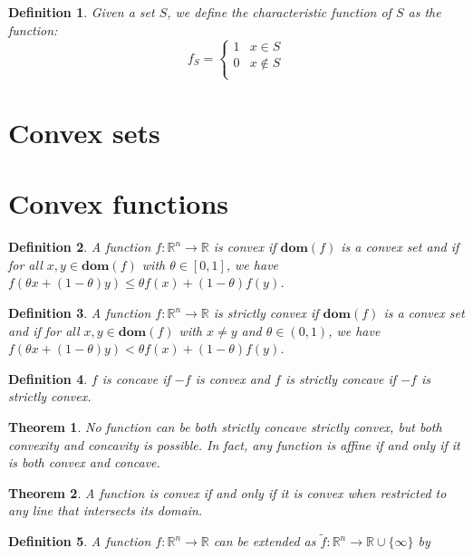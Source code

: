 \documentclass[a4paper]{article}
\newtheorem{mytheorem}{Theorem}
\newtheorem{mydef}{Definition}
\numberwithin{mytheorem}{section}
\numberwithin{mydef}{section}
\numberwithin{example}{section}
\begin{document}
\begin{mydef} Given a set $S$, we define the characteristic function of $S$ as the function:
$$ f_{S} = 
\begin{cases} 
      1 &  x \in S \\
      0 & x \notin S \\
   \end{cases}
$$
 
\end{mydef}


\section{Convex sets}



\section{Convex functions}

\begin{mydef} A function $f : \mathbb{R}^{n} \rightarrow \mathbb{R} $ is convex if $\textbf{dom}(f)$ is a convex set and if for all $x,y \in \textbf{dom}(f)$ with $\theta \in [0,1]$, we have $f(\theta x + (1-\theta)y) \leq \theta f(x) + (1-\theta)f(y)$.  \end{mydef}

\begin{mydef} A function $f : \mathbb{R}^{n} \rightarrow \mathbb{R} $ is strictly convex if $\textbf{dom}(f)$ is a convex set and if for all $x,y \in \textbf{dom}(f)$ with $x \neq y$ and $\theta \in (0,1)$, we have $f(\theta x + (1-\theta)y) < \theta f(x) + (1-\theta)f(y)$.  \end{mydef}

\begin{mydef} $f$ is concave if $-f$ is convex and $f$ is strictly concave if $-f$ is strictly convex.  \end{mydef}

\begin{mytheorem} No function can be both strictly concave strictly convex, but both convexity and concavity is possible. In fact, any function is affine if and only if it is both convex and concave. \end{mytheorem}

\begin{mytheorem} A function is convex if and only if it is convex when restricted to any line that intersects its domain. \end{mytheorem}

\begin{mydef} A function $f : \mathbb{R}^{n} \rightarrow \mathbb{R}$ can be extended as $\widetilde{f} : \mathbb{R}^{n} \rightarrow \mathbb{R} \cup \{ \infty \}$ by 
\end{mydef}
\end{document}
